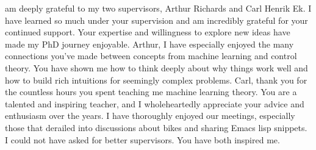 \documentclass{mimosis-class/mimosis}
\numberwithin{equation}{chapter}
\begin{document}
\label{sec:orge4cce31}
\begin{singlespace}
 am deeply grateful to my two supervisors, Arthur Richards and Carl Henrik Ek.
I have learned so much under your supervision and am incredibly grateful for your continued support.
Your expertise and willingness to explore new ideas have made my PhD journey enjoyable.
Arthur, I have especially enjoyed the many connections you've made between concepts from machine learning and control theory.
You have shown me how to think deeply about why things work well and how
to build rich intuitions for seemingly complex problems.
Carl, thank you for the countless hours you spent teaching me machine learning theory.
You are a talented and inspiring teacher, and I wholeheartedly appreciate your advice and enthusiasm over the years.
I have thoroughly enjoyed our meetings, especially those that derailed into discussions about bikes
and sharing Emacs lisp snippets.
I could not have asked for better supervisors.
You have both inspired me.








\end{singlespace}
\end{document}
